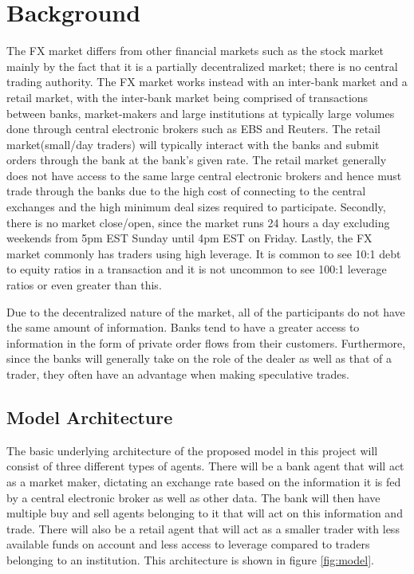 \chapter{Background}
The FX market differs from other financial markets such as the stock market mainly by the fact that it is a partially decentralized market; there is no central trading authority. The FX market works instead with an inter-bank market and a retail market, with the inter-bank market being comprised of transactions between banks, market-makers and large institutions at typically large volumes done through central electronic brokers such as EBS and Reuters. The retail market(small/day traders) will typically interact with the banks and submit orders through the bank at the bank's given rate. The retail market generally does not have access to the same large central electronic brokers and hence must trade through the banks due to the high cost of connecting to the central exchanges and the high minimum deal sizes required to participate. Secondly, there is no market close/open, since the market runs 24 hours a day excluding weekends from 5pm EST Sunday until 4pm EST on Friday. Lastly, the FX market commonly has traders using high leverage. It is common to see 10:1 debt to equity ratios in a transaction and it is not uncommon to see 100:1 leverage ratios or even greater than this\cite{leverage}.
	
Due to the decentralized nature of the market, all of the participants do not have the same amount of information. Banks tend to have a greater access to information in the form of private order flows from their customers. Furthermore, since the banks will generally take on the role of the dealer as well as that of a trader, they often have an advantage when making speculative trades.

\section{Model Architecture}
The basic underlying architecture of the proposed model in this project will consist of three different types of agents. There will be a bank agent that will act as a market maker, dictating an exchange rate based on the information it is fed by a central electronic broker as well as other data. The bank will then have multiple buy and sell agents belonging to it that will act on this information and trade. There will also be a retail agent that will act as a smaller trader with less available funds on account and less access to leverage compared to traders belonging to an institution. This architecture is shown in figure \ref{fig:model}.\\

